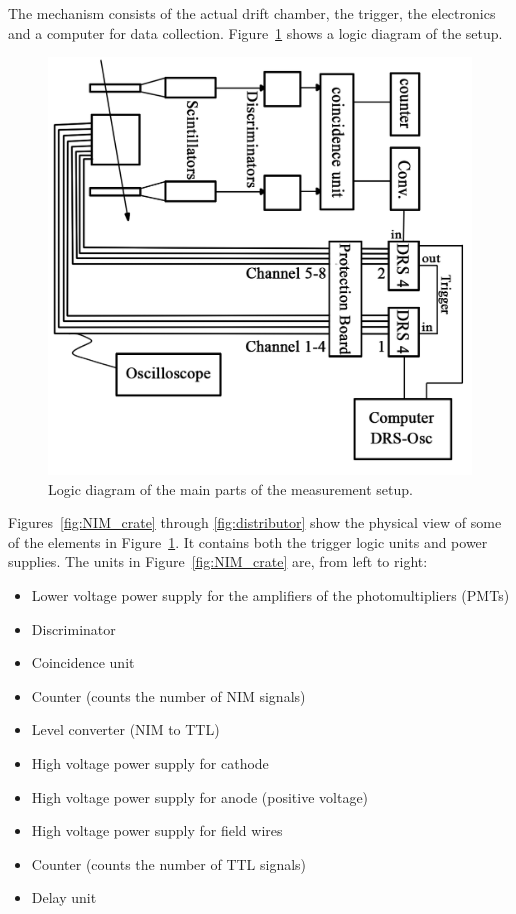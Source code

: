 \documentclass[12pt]{article}
\begin{document}
The mechanism consists of the actual drift chamber, the trigger, the electronics and a computer for data collection. Figure~\ref{fig:schema} shows a logic diagram of the setup. 

\begin{figure}[!h]
\includegraphics[width=13cm]{pics/Schema.jpg}
\centering
\caption{Logic diagram of the main parts of the measurement setup.}
\label{fig:schema}
\end{figure}

Figures~\ref{fig:NIM_crate} through \ref{fig:distributor} show the physical view of some of the elements in Figure~\ref{fig:schema}. It contains both the trigger logic units and power supplies. The units in Figure~\ref{fig:NIM_crate} are, from left to right:
\begin{itemize}
\item Lower voltage power supply for the amplifiers of the photomultipliers (PMTs)
\item Discriminator
\item Coincidence unit
\item Counter (counts the number of NIM signals)
\item Level converter (NIM to TTL)
\item High voltage power supply for cathode
\item High voltage power supply for anode (positive voltage)
\item High voltage power supply for field wires
\item Counter (counts the number of TTL signals)
\item Delay unit
\end{itemize}
\end{document}
